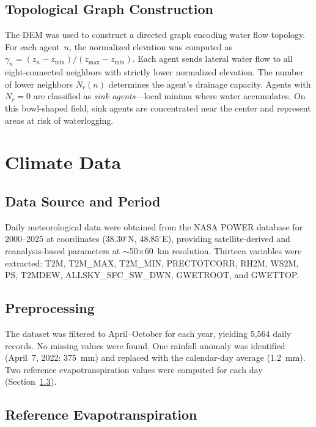 \documentclass[12pt, a4paper]{article}
\begin{document}
\subsection{Topological Graph Construction}

The DEM was used to construct a directed graph encoding water flow topology. For each agent~$n$, the normalized elevation was computed as $\gamma_n = (z_n - z_{\min})/(z_{\max} - z_{\min})$. Each agent sends lateral water flow to all eight-connected neighbors with strictly lower normalized elevation. The number of lower neighbors $N_r(n)$ determines the agent's drainage capacity. Agents with $N_r = 0$ are classified as \emph{sink agents}---local minima where water accumulates. On this bowl-shaped field, sink agents are concentrated near the center and represent areas at risk of waterlogging.


\section{Climate Data}

\subsection{Data Source and Period}

Daily meteorological data were obtained from the NASA POWER database for 2000--2025 at coordinates (38.30$^{\circ}$N, 48.85$^{\circ}$E), providing satellite-derived and reanalysis-based parameters at $\sim$50$\times$60~km resolution. Thirteen variables were extracted: T2M, T2M\_MAX, T2M\_MIN, PRECTOTCORR, RH2M, WS2M, PS, T2MDEW, ALLSKY\_SFC\_SW\_DWN, GWETROOT, and GWETTOP.

\subsection{Preprocessing}

The dataset was filtered to April--October for each year, yielding 5,564 daily records. No missing values were found. One rainfall anomaly was identified (April~7, 2022: 375~mm) and replaced with the calendar-day average (1.2~mm). Two reference evapotranspiration values were computed for each day (Section~\ref{sec:et0}).

\subsection{Reference Evapotranspiration}
\label{sec:et0}
\end{document}
